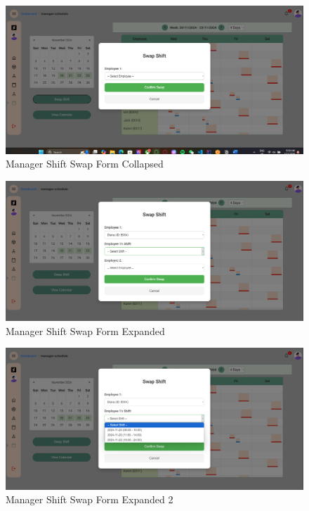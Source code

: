 \documentclass[a4paper,12pt, oneside]{report}
\begin{document}
\begin{itemize}
    \begin{figure}[H]
    \centering
    \includegraphics[width=0.8\columnwidth]{ManagerPages/ManagerSchedule3.png}
    \caption{Manager Shift Swap Form Collapsed}
    \label{fig:manager-shift-swap-form-c}
    \end{figure}

    \begin{figure}[H]
    \centering
    \includegraphics[width=0.8\columnwidth]{ManagerPages/ManagerSchedule4.png}
    \caption{Manager Shift Swap Form Expanded}
    \label{fig:manager-shift-swap-form-e}
    \end{figure}

    \begin{figure}[H]
    \centering
    \includegraphics[width=0.8\columnwidth]{ManagerPages/ManagerSchedule5.png}
    \caption{Manager Shift Swap Form Expanded 2}
    \label{fig:manager-shift-swap-form-e-2}
    \end{figure}


\end{itemize}
\end{document}
